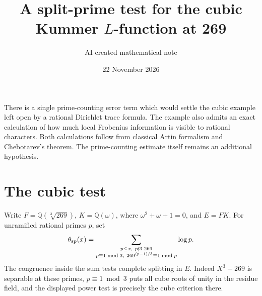 \documentclass[11pt]{article}
\title{A split-prime test for the cubic Kummer \(L\)-function at 269}
\author{AI-created mathematical note}
\date{22 November 2026}
\newcommand{\Q}{\mathbb Q}
\begin{document}
\maketitle
\noindent
There is a single prime-counting error term which would settle the cubic
example left open by a rational Dirichlet trace formula. The example also
admits an exact calculation of how much local Frobenius information is
visible to rational characters. Both calculations follow from classical
Artin formalism and Chebotarev's theorem. The prime-counting estimate itself
remains an additional hypothesis.

\section{The cubic test}
Write \(F=\Q(\sqrt[3]{269})\), \(K=\Q(\omega)\), where
\(\omega^2+\omega+1=0\), and \(E=FK\). For unramified rational primes
\(p\), set
\[
 \theta_{\rm sp}(x)=
 \sum_{\substack{p\le x,\ p\nmid 3\cdot269\\
 p\equiv1\bmod3,\ 269^{(p-1)/3}\equiv1\bmod p}}\log p .
\]
The congruence inside the sum tests complete splitting in \(E\).
Indeed \(X^3-269\) is separable at these primes, \(p\equiv1\bmod3\)
puts all cube roots of unity in the residue field, and the displayed
power test is precisely the cube criterion there.
\end{document}
